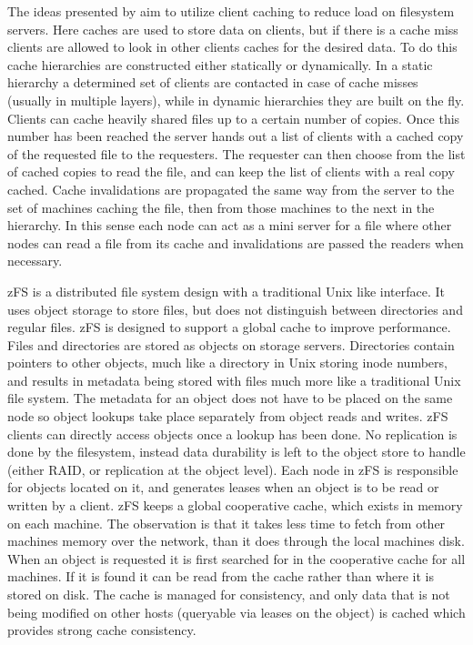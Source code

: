 The ideas presented by \cite{Blaze1992} aim to utilize client caching to
reduce load on filesystem servers. Here caches are used to store data on
clients, but if there is a cache miss clients are allowed to look in other
clients caches for the desired data. To do this cache hierarchies are
constructed either statically or dynamically. In a static hierarchy a
determined set of clients are contacted in case of cache misses (usually in
multiple layers), while in dynamic hierarchies they are built on the fly.
Clients can cache heavily shared files up to a certain number of copies. Once
this number has been reached the server hands out a list of clients with a
cached copy of the requested file to the requesters. The requester can then
choose from the list of cached copies to read the file, and can keep the list
of clients with a real copy cached.  Cache invalidations are propagated the
same way from the server to the set of machines caching the file, then from
those machines to the next in the hierarchy. In this sense each node can act
as a mini server for a file where other nodes can read a file from its cache
and invalidations are passed the readers when necessary.


zFS \cite{Rodeh2003} is a distributed file system design with a traditional
Unix like interface. It uses object storage to store files, but does not
distinguish between directories and regular files. zFS is designed to support
a global cache to improve performance. Files and directories are stored as
objects on storage servers. Directories contain pointers to other objects,
much like a directory in Unix storing inode numbers, and results in metadata
being stored with files much more like a traditional Unix file system. The
metadata for an object does not have to be placed on the same node so object
lookups take place separately from object reads and writes. zFS clients can
directly access objects once a lookup has been done. No replication is done by
the filesystem, instead data durability is left to the object store to handle
(either RAID, or replication at the object level). Each node in zFS is
responsible for objects located on it, and generates leases when an object is
to be read or written by a client. zFS keeps a global cooperative cache, which
exists in memory on each machine. The observation is that it takes less time
to fetch from other machines memory over the network, than it does through the
local machines disk. When an object is requested it is first searched for in
the cooperative cache for all machines. If it is found it can be read from the
cache rather than where it is stored on disk. The cache is managed for
consistency, and only data that is not being modified on other hosts
(queryable via leases on the object) is cached which provides strong cache
consistency.


